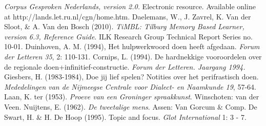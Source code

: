\documentclass[12pt]{article}
\begin{document}
\begin{thebibliography}{99}\footnotesize
{}
\emph{Corpus Gesproken Nederlands, version 2.0.} Electronic resource. Available online at http://lands.let.ru.nl/cgn/home.htm.
Daelemans, W., J. Zavrel, K. Van der Sloot, \& A. Van den Bosch (2010). \emph{TiMBL: Tilburg Memory Based Learner, version 6.3, Reference Guide}. ILK Research Group Technical Report Series no. 10-01.
Duinhoven, A. M. (1994), Het hulpwerkwoord doen heeft afgedaan. \emph{Forum der Letteren 35}, 2: 110-131.
Cornips, L. (1994). De hardnekkige vooroordelen over de regionale doen+infinitief-constructie. \emph{Forum der Letteren. Jaargang 1994.}
Giesbers, H. (1983-1984), Doe jij lief spelen? Notities over het perifrastisch doen. \emph{Mededelingen van de Nijmeegse Centrale voor Dialect- en Naamkunde 19}, 57-64.
Laan, K. ter (1953). \emph{Proeve van een Groninger spraakkunst}. Winschoten: van der Veen.
Nuijtens, E. (1962). \emph{De tweetalige mens}. Assen: Van Gorcum \& Comp.
De Swart, H. \& H. De Hoop (1995). Topic and focus. \emph{Glot International} 1: 3 - 7.
\end{thebibliography}
\end{document}
